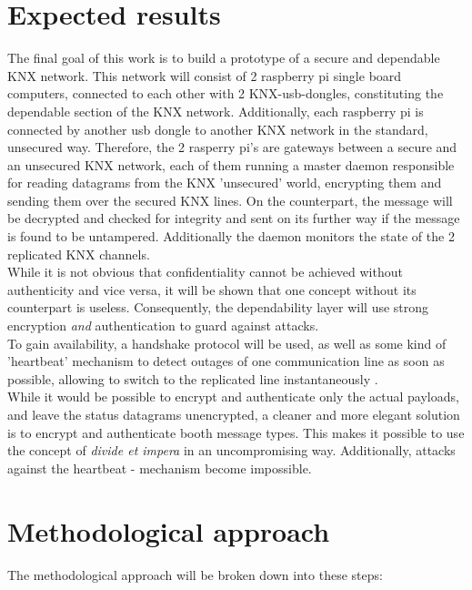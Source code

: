 \documentclass[a4paper,12pt,twoside]{memoir}
\begin{document}
\section{Expected results}

The final goal of this work is to build a prototype of a secure and dependable KNX network. This network
will consist of 2 raspberry pi single board computers, connected to each other with 2 KNX-usb-dongles, 
constituting the dependable section of the KNX network. Additionally, each raspberry pi is connected by
another usb dongle to another KNX  network in the standard, unsecured way. Therefore, the 2 rasperry pi's
are gateways between a secure and an unsecured KNX network, each of them running a master daemon responsible
for reading datagrams from the KNX 'unsecured' world, encrypting them and sending them over the secured
KNX lines. On the counterpart, the message will be decrypted and checked for integrity and sent
on its further way if the message is found to be untampered. Additionally the daemon monitors the state of the 2
replicated KNX channels.
\\
While it is not obvious that confidentiality cannot be achieved without authenticity and vice versa,
it will be shown that one concept without its counterpart is useless. 
Consequently, the dependability layer will use strong encryption \textit{and} authentication to guard
against attacks.
\\
To gain availability, a handshake protocol will be used, as well as some kind of 'heartbeat' mechanism to
detect outages of one communication line as soon as possible, allowing to switch to the replicated line 
instantaneously	.
\\
While it would be possible to encrypt and authenticate only the actual payloads, and leave the status
datagrams unencrypted, a cleaner and more elegant solution is to encrypt and authenticate booth message 
types. This makes it possible to use the concept of \textit{divide et impera} in an uncompromising way.
Additionally, attacks against the heartbeat - mechanism become impossible.

\section{Methodological approach}

The methodological approach will be broken down into these steps:
\end{document}
